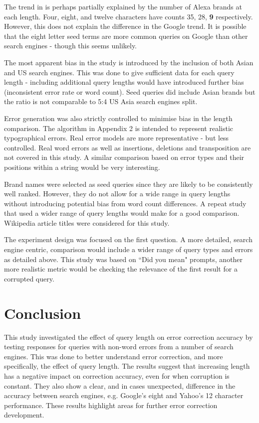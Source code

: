\documentclass{csfourzero}
\begin{document}
The trend in is perhaps partially explained by the number of Alexa brands at each length. Four, eight, and twelve characters have counts 35, 28, \textbf{9} respectively. However, this does not explain the difference in the Google trend. It is possible that the eight letter seed terms are more common queries on Google than other search engines - though this seems unlikely.

The most apparent bias in the study is introduced by the inclusion of both Asian and US search engines. This was done to give sufficient data for each query length - including additional query lengths would have introduced further bias (inconsistent error rate or word count). Seed queries did include Asian brands but the ratio is not comparable to 5:4 US Asia search engines split.

Error generation was also strictly controlled to minimise bias in the length comparison. The algorithm in Appendix 2 is intended to represent realistic typographical errors. Real error models are more representative - but less controlled. Real word errors as well as insertions, deletions and transposition are not covered in this study. A similar comparison based on error types and their positions within a string would be very interesting.

Brand names were selected as seed queries since they are likely to be consistently well ranked. However, they do not allow for a wide range in query lengths without introducing potential bias from word count differences. A repeat study that used a wider range of query lengths would make for a good comparison. Wikipedia article titles were considered for this study.

The experiment design was focused on the first question. A more detailed, search engine centric, comparison would include a wider range of query types and errors as detailed above. This study was based on ``Did you mean" prompts, another more realistic metric would be checking the relevance of the first result for a corrupted query.

\section{Conclusion}
\label{sec:conc}

This study investigated the effect of query length on error correction accuracy by testing responses for queries with non-word errors from a number of search engines. This was done to better understand error correction, and more specifically, the effect of query length. The results suggest that increasing length has a negative impact on correction accuracy, even for when corruption is constant. They also show a clear, and in cases unexpected, difference in the accuracy between search engines, e.g. Google's eight and Yahoo's 12 character performance. These results highlight areas for further error correction development.
\end{document}
